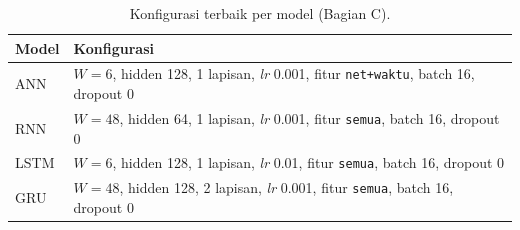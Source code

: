 \begin{table}[t]
\centering
\scriptsize
\caption{Konfigurasi terbaik per model (Bagian C).}
\label{tab:cfg}
\begin{tabular}{@{}lp{6.6cm}@{}}
\toprule
Model & Konfigurasi \\
\midrule
ANN & $W{=}6$, hidden 128, 1 lapisan, \textit{lr} 0.001, fitur \texttt{net+waktu}, batch 16, dropout 0 \\
RNN & $W{=}48$, hidden 64, 1 lapisan, \textit{lr} 0.001, fitur \texttt{semua}, batch 16, dropout 0 \\
LSTM & $W{=}6$, hidden 128, 1 lapisan, \textit{lr} 0.01, fitur \texttt{semua}, batch 16, dropout 0 \\
GRU & $W{=}48$, hidden 128, 2 lapisan, \textit{lr} 0.001, fitur \texttt{semua}, batch 16, dropout 0 \\
\bottomrule
\end{tabular}
\end{table}